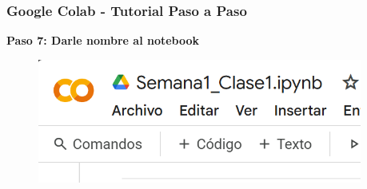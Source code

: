 \documentclass[10pt]{beamer}
\begin{document}
\begin{frame}
  \frametitle{Google Colab - Tutorial Paso a Paso}
  \begin{center}
    \textbf{Paso 7: Darle nombre al notebook}
  \end{center}
  \begin{figure}
    \includegraphics[width=0.95\textwidth]{2) Colab/GColab07.png}
  \end{figure}
\end{frame}
\end{document}
